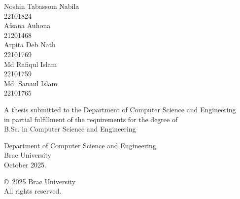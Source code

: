\begin{titlepage}
\renewcommand*{\thepage}{Title} %

    \begin{center} 
        \vspace*{3cm} %
        
        {\fontsize{16pt}{22pt}\selectfont{Making AI More Trustworthy with Context Labels
and Original Source Tracking}
        } %
        
        \vspace{1.5cm}
        
        
        \vspace{0.5cm}
        
        	Noshin Tabassom Nabila\\
	        22101824\\
	        Afsana Auhona \\
	        21201468\\
	        Arpita Deb Nath\\
	        22101769\\
	        Md Rafiqul Islam\\
	        22101759\\
            Md. Sanaul Islam\\
            22101765

        \vspace{1.5cm}
        
        	A thesis submitted to the Department of Computer Science and Engineering\\
            in partial fulfillment of the requirements for the degree of\\
            B.Sc. in Computer Science and Engineering

        
        \vspace{2.5cm}
        
    		Department of Computer Science and Engineering\\
            Brac University\\
            October 2025.
        
        \vspace{3cm}
        
    		\copyright\ 2025 Brac University\\
            All rights reserved.
    
    \end{center}

\end{titlepage}